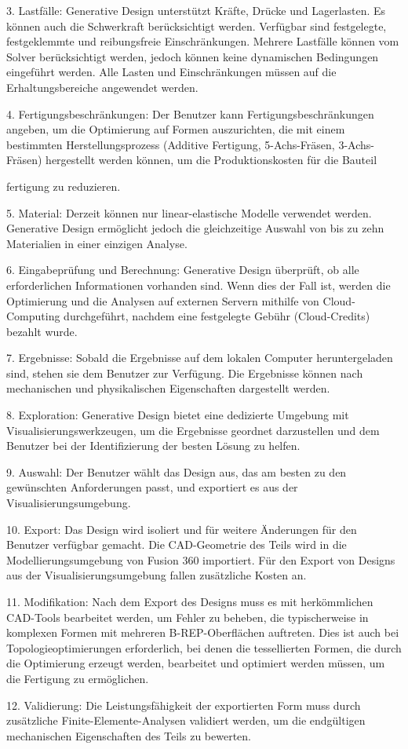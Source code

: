 3. Lastfälle: Generative Design unterstützt Kräfte, Drücke und Lagerlasten. Es können auch die Schwerkraft berücksichtigt werden. Verfügbar sind festgelegte, festgeklemmte und reibungsfreie Einschränkungen. Mehrere Lastfälle können vom Solver berücksichtigt werden, jedoch können keine dynamischen Bedingungen eingeführt werden. Alle Lasten und Einschränkungen müssen auf die Erhaltungsbereiche angewendet werden.

4. Fertigungsbeschränkungen: Der Benutzer kann Fertigungsbeschränkungen angeben, um die Optimierung auf Formen auszurichten, die mit einem bestimmten Herstellungsprozess (Additive Fertigung, 5-Achs-Fräsen, 3-Achs-Fräsen) hergestellt werden können, um die Produktionskosten für die Bauteil

fertigung zu reduzieren.

5. Material: Derzeit können nur linear-elastische Modelle verwendet werden. Generative Design ermöglicht jedoch die gleichzeitige Auswahl von bis zu zehn Materialien in einer einzigen Analyse.

6. Eingabeprüfung und Berechnung: Generative Design überprüft, ob alle erforderlichen Informationen vorhanden sind. Wenn dies der Fall ist, werden die Optimierung und die Analysen auf externen Servern mithilfe von Cloud-Computing durchgeführt, nachdem eine festgelegte Gebühr (Cloud-Credits) bezahlt wurde.

7. Ergebnisse: Sobald die Ergebnisse auf dem lokalen Computer heruntergeladen sind, stehen sie dem Benutzer zur Verfügung. Die Ergebnisse können nach mechanischen und physikalischen Eigenschaften dargestellt werden.

8. Exploration: Generative Design bietet eine dedizierte Umgebung mit Visualisierungswerkzeugen, um die Ergebnisse geordnet darzustellen und dem Benutzer bei der Identifizierung der besten Lösung zu helfen.

9. Auswahl: Der Benutzer wählt das Design aus, das am besten zu den gewünschten Anforderungen passt, und exportiert es aus der Visualisierungsumgebung.

10. Export: Das Design wird isoliert und für weitere Änderungen für den Benutzer verfügbar gemacht. Die CAD-Geometrie des Teils wird in die Modellierungsumgebung von Fusion 360 importiert. Für den Export von Designs aus der Visualisierungsumgebung fallen zusätzliche Kosten an.

11. Modifikation: Nach dem Export des Designs muss es mit herkömmlichen CAD-Tools bearbeitet werden, um Fehler zu beheben, die typischerweise in komplexen Formen mit mehreren B-REP-Oberflächen auftreten. Dies ist auch bei Topologieoptimierungen erforderlich, bei denen die tessellierten Formen, die durch die Optimierung erzeugt werden, bearbeitet und optimiert werden müssen, um die Fertigung zu ermöglichen.

12. Validierung: Die Leistungsfähigkeit der exportierten Form muss durch zusätzliche Finite-Elemente-Analysen validiert werden, um die endgültigen mechanischen Eigenschaften des Teils zu bewerten.